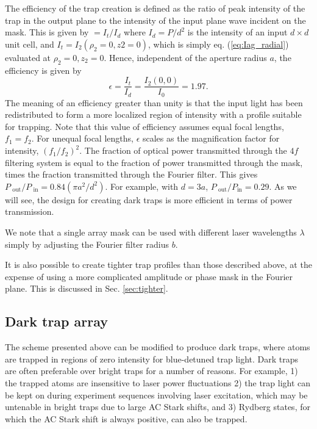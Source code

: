 The efficiency of the trap creation is defined as the ratio of peak intensity of the trap in the output plane to the intensity of the input plane wave incident on the mask. This is given by $=I_{t}/I_{d}$ where $I_{d} = P / d^{2}$ is the intensity of an input $d \times d$ unit cell, and $I_{t} = I_2(\rho_2=0,z2=0)$, which is simply  eq. (\ref{eq:Iag_radial}) evaluated at $\rho_2=0,z_2=0$. Hence, independent of the aperture radius $a$, the efficiency is given by
\begin{equation}\label{eq:brighteff}
    \epsilon = \frac{I_{t}}{I_{d}} = \frac{I_{2}\left(0,0\right)}{I_{0}}=1.97.
\end{equation}
The meaning of an efficiency greater than unity is that the input light has been redistributed to form a more localized region of intensity with a profile suitable for trapping. Note that this value of efficiency assumes equal focal lengths, $f_1=f_2$. For unequal focal lengths, $\epsilon$ scales as the magnification factor for intensity, $(f_1/f_2)^2$. 
The fraction of optical power transmitted through the $4f$ filtering system is equal to the fraction of power transmitted through the mask, times the fraction transmitted through the Fourier filter. This gives $ P_{\text{ out}}/P_{\text{ in}}= 0.84(\pi a^2/d^2)$. For example, with $d=3a$, $P_{\text{ out}}/P_{\text {in}}=0.29$. As we will see, the design for creating dark traps is  more efficient in terms of power transmission.

We note that a single array mask can be used with different laser wavelengths $\lambda$ simply by adjusting the Fourier filter radius $b$.

It is also possible to create tighter trap profiles than those described above, at the expense of using a  more complicated amplitude or phase mask in the Fourier plane\cite{Beguin2020}. This is discussed in Sec. \ref{sec:tighter}.

\subsection{Dark trap array}
The scheme presented above can be modified to produce dark traps, where atoms are trapped in regions of zero intensity for blue-detuned trap light. Dark traps are often preferable over bright traps for a number of reasons. For example, 1) the trapped atoms are insensitive to laser power fluctuations 2) the trap light can be kept on during experiment sequences involving laser excitation, which may be untenable in bright traps due to large AC Stark shifts, and 3) Rydberg states, for which the AC Stark shift is always positive, can also be trapped\cite{SZhang2011}.

